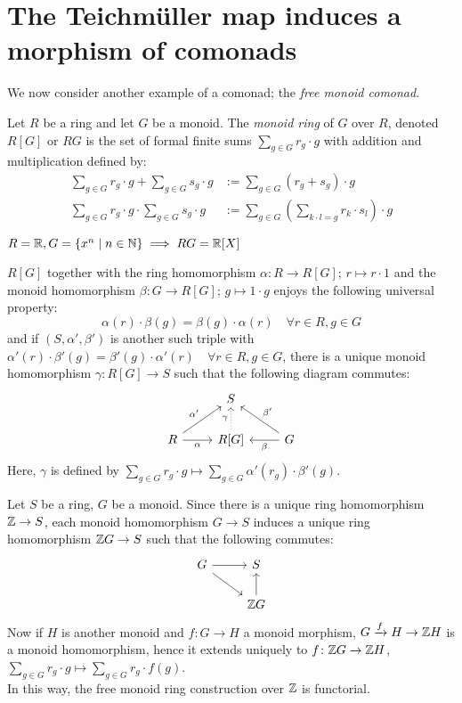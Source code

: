 \section*{The Teichmüller map induces a morphism of comonads}
We now consider another example of a comonad; the \textit{free monoid comonad}.
\begin{definition}
    Let $R$ be a ring and let $G$ be a monoid.
    The \textit{monoid ring} of $G$ over $R$, denoted $R[G]$ or $RG$
    is the set of formal finite sums $\sum_{g \in G}r_g \cdot g$
    with addition and multiplication defined by:
    \begin{align*}
        \sum_{g \in G}r_g \cdot g + \sum_{g \in G}s_g \cdot g
        & := \sum_{g \in G}(r_g + s_g)\cdot g \\
        \sum_{g \in G}r_g \cdot g \cdot \sum_{g \in G}s_g \cdot g
        & := \sum_{g \in G}(\sum_{k \cdot l = g} r_k \cdot s_l)\cdot g 
    \end{align*}
\end{definition}
\begin{example}
    $R = \mathbb{R}, G = \{x^n \mid n \in \mathbb{N}\} \implies RG = \mathbb{R}[X]$
\end{example}
\begin{proposition} \label{prop: universal property of monoid ring}
$R[G]$ together with the ring homomorphism $\alpha \colon R \to R[G]$;
$r \mapsto r \cdot 1$ and the monoid homomorphism $\beta \colon 
G \to R[G]$; $g \mapsto 1 \cdot g$ 
enjoys the following universal property:
\[
  \alpha(r) \cdot \beta(g) = \beta(g) \cdot \alpha(r)
   \quad \forall r \in R, g \in G
\]
and if $(S,\alpha',\beta')$ is another such triple with
$\alpha'(r) \cdot \beta'(g) = \beta'(g) \cdot \alpha'(r)
   \quad \forall r \in R, g \in G$,
there is a unique monoid homomorphism $\gamma \colon R[G] \to S$
such that the following diagram commutes:
\[
    \begin{tikzcd}
        & S \\
        R \arrow[r,"\alpha"'] \arrow[ur,"\alpha'"] 
        & R[G] \arrow[u,"\gamma",dotted] 
        & G \arrow[l,"\beta"] \arrow[ul,"\beta'"']
    \end{tikzcd}
\]
Here, $\gamma$ is defined by 
$\sum_{g \in G}r_g \cdot g \mapsto \sum_{g \in G}\alpha'(r_g) \cdot \beta'(g)$.
\end{proposition}
\begin{example}
    Let $S$ be a ring, $G$ be a monoid.
    Since there is a unique ring homomorphism $\mathbb{Z} \to S$, 
    each monoid homomorphism $G \to S$ induces a unique ring homomorphism
    $\mathbb{Z} G \to S$ such that the following commutes:
    \[
      \begin{tikzcd}
        G \arrow[r] \arrow[rd] 
        &S \\
        & \Z G \arrow[u]
      \end{tikzcd}
    \]
    Now if $H$ is another monoid and $f \colon G \to H$ a monoid morphism,
    $G \xrightarrow{f} H \to \mathbb{Z} H$ is a monoid homomorphism,
    hence it extends uniquely to $f \colon \mathbb{Z} G \to \mathbb{Z} H$,
    $\sum_{g \in G}r_g \cdot g \mapsto \sum_{g \in G}r_g \cdot f(g)$.\\ 
    In this way, the free monoid ring construction over $\mathbb{Z}$ is functorial.
\end{example}
